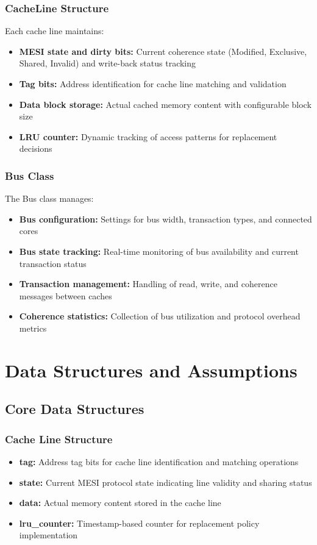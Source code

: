 \documentclass[10pt]{article}
\begin{document}
\subsubsection{CacheLine Structure}
Each cache line maintains:
\begin{itemize}
    \item \textbf{MESI state and dirty bits:} Current coherence state (Modified, Exclusive, Shared, Invalid) and write-back status tracking
    \item \textbf{Tag bits:} Address identification for cache line matching and validation
    \item \textbf{Data block storage:} Actual cached memory content with configurable block size
    \item \textbf{LRU counter:} Dynamic tracking of access patterns for replacement decisions
\end{itemize}

\subsubsection{Bus Class}
The Bus class manages:
\begin{itemize}
    \item \textbf{Bus configuration:} Settings for bus width, transaction types, and connected cores
    \item \textbf{Bus state tracking:} Real-time monitoring of bus availability and current transaction status
    \item \textbf{Transaction management:} Handling of read, write, and coherence messages between caches
    \item \textbf{Coherence statistics:} Collection of bus utilization and protocol overhead metrics
\end{itemize}

\section{Data Structures and Assumptions}
\subsection{Core Data Structures}
\subsubsection{Cache Line Structure}
\begin{itemize}
    \item \textbf{tag:} Address tag bits for cache line identification and matching operations
    \item \textbf{state:} Current MESI protocol state indicating line validity and sharing status
    \item \textbf{data:} Actual memory content stored in the cache line
    \item \textbf{lru\_counter:} Timestamp-based counter for replacement policy implementation
\end{itemize}
\end{document}
